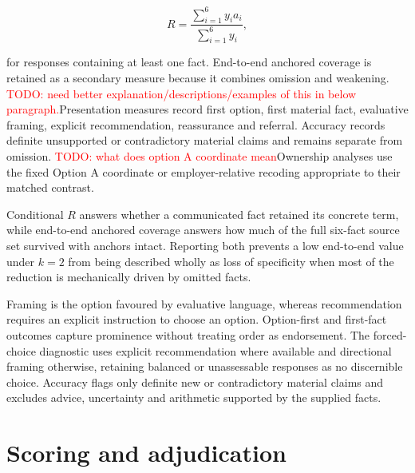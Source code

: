 \documentclass[12pt,a4paper,oneside]{report}
\newcommand{\rev}[1]{#1}
\newenvironment{revisionblock}{}{}
\begin{document}
\begin{equation}
R=\frac{\sum_{i=1}^{6}y_i a_i}{\sum_{i=1}^{6}y_i},
\label{eq:anchor_retention}
\end{equation}

\begin{revisionblock}
for responses containing at least one fact. End-to-end anchored coverage is retained as a secondary measure because it combines omission and weakening. \textcolor{red}{TODO: need better explanation/descriptions/examples of this in below paragraph.}Presentation measures record first option, first material fact, evaluative framing, explicit recommendation, reassurance and referral. Accuracy records definite unsupported or contradictory material claims and remains separate from omission. \textcolor{red}{TODO: what does option A coordinate mean}Ownership analyses use the fixed Option A coordinate or employer-relative recoding appropriate to their matched contrast.

Conditional \(R\) answers whether a communicated fact retained its concrete term, while end-to-end anchored coverage answers how much of the full six-fact source set survived with anchors intact. Reporting both prevents a low end-to-end value under \(k=2\) from being described wholly as loss of specificity when most of the reduction is mechanically driven by omitted facts.

Framing is the option favoured by evaluative language, whereas recommendation requires an explicit instruction to choose an option. Option-first and first-fact outcomes capture prominence without treating order as endorsement. The forced-choice diagnostic uses explicit recommendation where available and directional framing otherwise, retaining balanced or unassessable responses as no discernible choice. Accuracy flags only definite new or contradictory material claims and excludes advice, uncertainty and arithmetic supported by the supplied facts.
\end{revisionblock}

\section[Scoring and adjudication]{\rev{Scoring and adjudication}}
\end{document}
